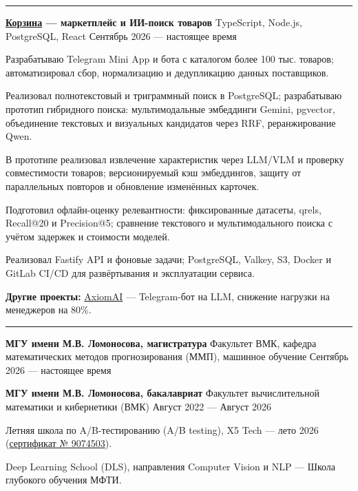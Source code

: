 \documentclass[10pt,a4paper]{article}
\newcommand{\cvsection}[1]{%
  \vspace{5pt}{\large\bfseries #1}\par\vspace{2pt}\hrule\vspace{3pt}}
\newcommand{\cventry}[3]{%
  \textbf{#1} \textbar{} #3 \textbar{} #2\par\vspace{1pt}}
\begin{document}
\cvsection{Проекты}
\cventry{\href{https://github.com/noobmaster-ru/korzina-market}{Корзина} --- маркетплейс и ИИ-поиск товаров}{Сентябрь 2026 --- настоящее время}{TypeScript, Node.js, PostgreSQL, React}
\begin{cvitems}
    \item Разрабатываю Telegram Mini App и бота с каталогом более 100 тыс. товаров; автоматизировал сбор, нормализацию и дедупликацию данных поставщиков.
    \item Реализовал полнотекстовый и триграммный поиск в PostgreSQL; разрабатываю прототип гибридного поиска: мультимодальные эмбеддинги Gemini, pgvector, объединение текстовых и визуальных кандидатов через RRF, реранжирование Qwen.
    \item В прототипе реализовал извлечение характеристик через LLM/VLM и проверку совместимости товаров; версионируемый кэш эмбеддингов, защиту от параллельных повторов и обновление изменённых карточек.
    \item Подготовил офлайн-оценку релевантности: фиксированные датасеты, qrels, Recall@20 и Precision@5; сравнение текстового и мультимодального поиска с учётом задержек и стоимости моделей.
    \item Реализовал Fastify API и фоновые задачи; PostgreSQL, Valkey, S3, Docker и GitLab CI/CD для развёртывания и эксплуатации сервиса.
\end{cvitems}
\textbf{Другие проекты:} \href{https://github.com/noobmaster-ru/axiomai}{AxiomAI} --- Telegram-бот на LLM, снижение нагрузки на менеджеров на 80\%.\par

\cvsection{Образование}
\cventry{МГУ имени М.В. Ломоносова, магистратура}{Сентябрь 2026 --- настоящее время}{Факультет ВМК, кафедра математических методов прогнозирования (ММП), машинное обучение}
\vspace{2pt}
\cventry{МГУ имени М.В. Ломоносова, бакалавриат}{Август 2022 --- Август 2026}{Факультет вычислительной математики и кибернетики (ВМК)}
\begin{cvitems}
    \item Летняя школа по A/B-тестированию (A/B testing), X5 Tech --- лето 2026 (\href{https://disk.yandex.ru/i/5rZXupCvo3hMTw}{сертификат № 9074503}).
    \item Deep Learning School (DLS), направления Computer Vision и NLP --- Школа глубокого обучения МФТИ.
\end{cvitems}
\end{document}
